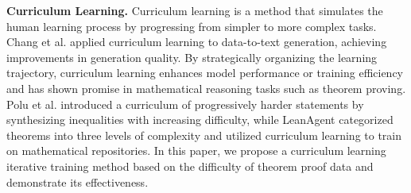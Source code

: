 \textbf{Curriculum Learning.} %
Curriculum learning \cite{bengio2009curriculum} 
is a method that simulates the human learning process by progressing from simpler to more complex tasks. 
Chang et al. \cite{chang2021does} applied curriculum learning to data-to-text generation, achieving improvements in generation quality. %
By strategically organizing the learning trajectory, curriculum learning enhances model performance or training efficiency and has shown promise in mathematical reasoning tasks such as theorem proving. %
Polu et al. \cite{polu2022formalCL} introduced a curriculum of progressively harder statements by synthesizing inequalities with increasing difficulty, 
while LeanAgent \cite{kumarappan2024leanagent} categorized theorems into three levels of complexity and utilized curriculum learning to train on mathematical repositories. 
In this paper, we propose a curriculum learning iterative training method based on the difficulty of theorem proof data and demonstrate its effectiveness.

